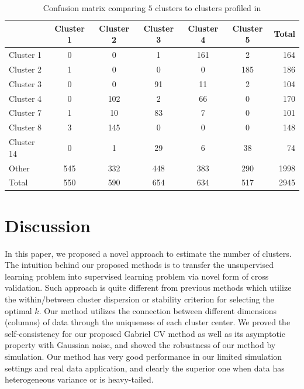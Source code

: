 \documentclass[12pt]{article}
\begin{document}
\begin{table}[H]
\caption{\label{table:confusion} \small{Confusion matrix comparing $5$ clusters to clusters profiled in \cite{tavazoie1999systematic}}}
\centering
\begin{tabular}{lcccccr}
  \hline
 & Cluster 1 & Cluster 2 & Cluster 3 & Cluster 4 & Cluster 5 & Total \\ 
  \hline
Cluster 1 & 0 & 0 & 1 & 161 & 2 & 164 \\ 
  Cluster 2 & 1 & 0 & 0 & 0 & 185 & 186 \\ 
  Cluster 3 & 0 & 0 & 91 & 11 & 2 & 104 \\ 
  Cluster 4 & 0 & 102 & 2 & 66 & 0 & 170 \\ 
  Cluster 7 & 1 & 10 & 83 & 7 & 0 & 101 \\ 
  Cluster 8 & 3 & 145 & 0 & 0 & 0 & 148 \\ 
  Cluster 14 & 0 & 1 & 29 & 6 & 38 & 74 \\ 
  Other & 545 & 332 & 448 & 383 & 290 & 1998 \\ 
  Total & 550 & 590 & 654 & 634 & 517 & 2945 \\ 
   \hline
\end{tabular}
\end{table}

\section{Discussion}
\label{sec:conc}
In this paper, we proposed a novel approach to estimate the number of
clusters. The intuition behind our proposed methods is to transfer the
unsupervised learning problem into supervised learning problem via novel form
of cross validation. Such approach is quite different from previous methods which 
utilize the within/between cluster dispersion or stability criterion for selecting the 
optimal $k$. Our method utilizes the connection between different dimensions (columns)
of data through the uniqueness of each cluster center. We proved the self-consistency 
for our proposed Gabriel CV method as well as its asymptotic property with Gaussian noise,
and showed the robustness of our method by simulation. Our method has very good performance
in our limited simulation settings and real data application, and clearly the superior
one when data has heterogeneous variance or is heavy-tailed.
\end{document}
